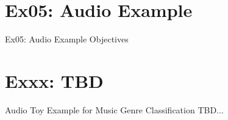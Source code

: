 \documentclass[mathserif, aspectratio=43]{intbeamer}
\begin{document}
\section{Ex05: Audio Example}
\begin{frame}{Ex05: Audio Example}
Objectives
\end{frame}






\section{Exxx: TBD}
\begin{frame}{Audio Toy Example for Music Genre Classification}
TBD...
\end{frame}





\end{document}
